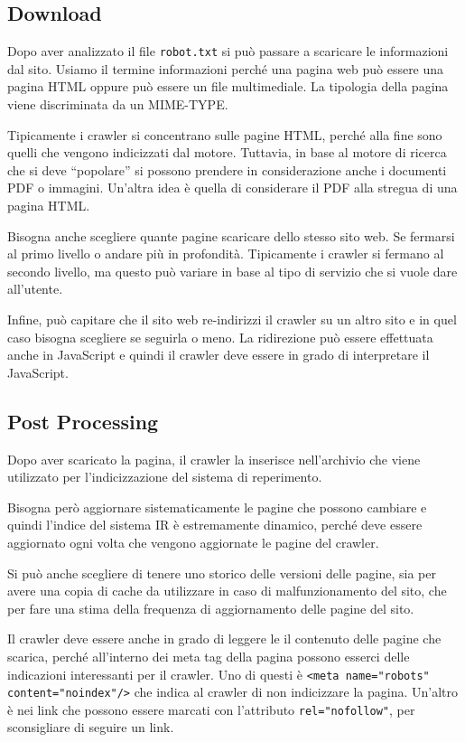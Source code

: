 \subsection{Download}

Dopo aver analizzato il file \texttt{robot.txt} si può passare a scaricare le informazioni dal sito.
Usiamo il termine informazioni perché una pagina web può essere una pagina HTML oppure può essere un file multimediale.
La tipologia della pagina viene discriminata da un MIME-TYPE.

Tipicamente i crawler si concentrano sulle pagine HTML, perché alla fine sono quelli che vengono indicizzati dal motore. Tuttavia, in base al motore di ricerca che si deve ``popolare'' si possono prendere in considerazione anche i documenti PDF o immagini.
Un'altra idea è quella di considerare il PDF alla stregua di una pagina HTML.

Bisogna anche scegliere quante pagine scaricare dello stesso sito web. Se fermarsi al primo livello o andare più in profondità. Tipicamente i crawler si fermano al secondo livello, ma questo può variare in base al tipo di servizio che si vuole dare all'utente.

Infine, può capitare che il sito web re-indirizzi il crawler su un altro sito e in quel caso bisogna scegliere se seguirla o meno. La ridirezione può essere effettuata anche in JavaScript e quindi il crawler deve essere in grado di interpretare il JavaScript.

\subsection{Post Processing}

Dopo aver scaricato la pagina, il crawler la inserisce nell'archivio che viene utilizzato per l'indicizzazione del sistema di reperimento.

Bisogna però aggiornare sistematicamente le pagine che possono cambiare e quindi l'indice del sistema IR è estremamente dinamico, perché deve essere aggiornato ogni volta che vengono aggiornate le pagine del crawler.

Si può anche scegliere di tenere uno storico delle versioni delle pagine, sia per avere una copia di cache da utilizzare in caso di malfunzionamento del sito, che per fare una stima della frequenza di aggiornamento delle pagine del sito.

Il crawler deve essere anche in grado di leggere le il contenuto delle pagine che scarica, perché all'interno dei meta tag della pagina possono esserci delle indicazioni interessanti per il crawler. Uno di questi è \texttt{<meta name="robots" content="noindex"/>} che indica al crawler di non indicizzare la pagina. Un'altro è nei link che possono essere marcati con l'attributo \texttt{rel="nofollow"}, per sconsigliare di seguire un link.

